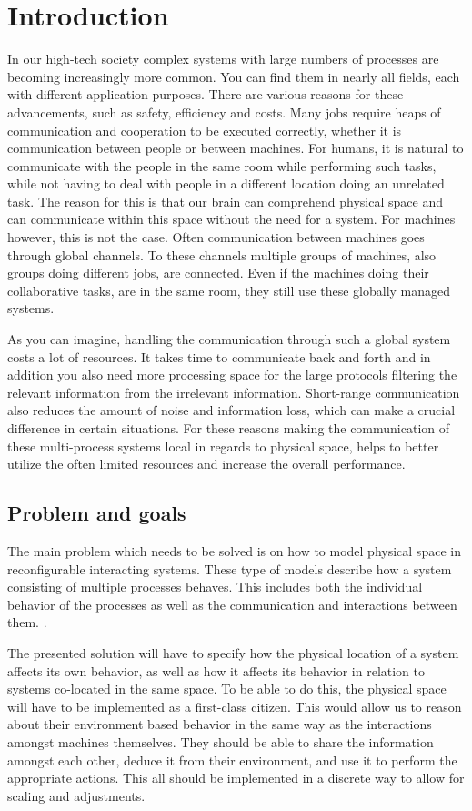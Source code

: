 
\chapter{Introduction}
In our high-tech society complex systems with large numbers of processes are becoming increasingly more common. You can find them in nearly all fields, each with different application purposes. There are various reasons for these advancements, such as safety, efficiency and costs. Many jobs require heaps of communication and cooperation to be executed correctly, whether it is communication between people or between machines. For humans, it is natural to communicate with the people in the same room while performing such tasks, while not having to deal with people in a different location doing an unrelated task. The reason for this is that our brain can comprehend physical space and can communicate within this space without the need for a system. For machines however, this is not the case. Often communication between machines goes through global channels. To these channels multiple groups of machines, also groups doing different jobs, are connected. Even if the machines doing their collaborative tasks, are in the same room, they still use these globally managed systems.

As you can imagine, handling the communication through such a global system costs a lot of resources. It takes time to communicate back and forth and in addition you also need more processing space for the large protocols filtering the relevant information from the irrelevant information. Short-range communication also reduces the amount of noise and information loss\cite{yin2021convergence}, which can make a crucial difference in certain situations. For these reasons making the communication of these multi-process systems local in regards to physical space, helps to better utilize the often limited resources and increase the overall performance. 

\section{Problem and goals}
The main problem which needs to be solved is on how to model physical space in reconfigurable interacting systems. These type of models describe how a system consisting of multiple processes behaves. This includes both the individual behavior of the processes as well as the communication and interactions between them. \cite{tran2013eiseval}. 

The presented solution will have to specify how the physical location of a system affects its own behavior, as well as how it affects its behavior in relation to systems co-located in the same space. To be able to do this, the physical space will have to be implemented as a first-class citizen. This would allow us to reason about their environment based behavior in the same way as the interactions amongst machines themselves. They should be able to share the information amongst each other, deduce it from their environment, and use it to perform the appropriate actions. This all should be implemented in a discrete way to allow for scaling and adjustments. 

